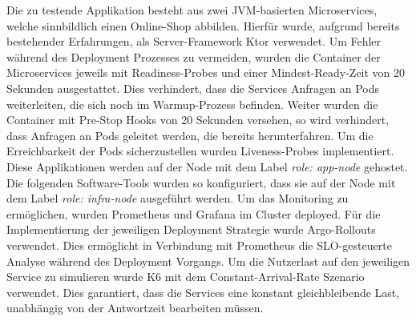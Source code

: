 \documentclass[
12pt,
a4paper,
twoside,
openright
]{report}
\begin{document}
	Die zu testende Applikation besteht aus zwei JVM-basierten Microservices, welche sinnbildlich einen Online-Shop abbilden. Hierfür wurde, aufgrund bereits bestehender Erfahrungen, als Server-Framework Ktor verwendet. Um Fehler während des Deployment Prozesses zu vermeiden, wurden die Container der Microservices jeweils mit Readiness-Probes und einer Mindest-Ready-Zeit von 20 Sekunden ausgestattet. Dies verhindert, dass die Services Anfragen an Pods weiterleiten, die sich noch im Warmup-Prozess befinden. Weiter wurden die Container mit Pre-Stop Hooks von 20 Sekunden versehen, so wird verhindert, dass Anfragen an Pods geleitet werden, die bereits herunterfahren. Um die Erreichbarkeit der Pods sicherzustellen wurden Liveness-Probes implementiert. Diese Applikationen werden auf der Node mit dem Label \textit{role: app-node} gehostet. Die folgenden Software-Tools wurden so konfiguriert, dass sie auf der Node mit dem Label \textit{role: infra-node} ausgeführt werden. Um das Monitoring zu ermöglichen, wurden Prometheus und Grafana im Cluster deployed. Für die Implementierung der jeweiligen Deployment Strategie wurde Argo-Rollouts verwendet. Dies ermöglicht in Verbindung mit Prometheus die SLO-gesteuerte Analyse während des Deployment Vorgangs. Um die Nutzerlast auf den jeweiligen Service zu simulieren wurde K6 mit dem Constant-Arrival-Rate Szenario verwendet. Dies garantiert, dass die Services eine konstant gleichbleibende Last, unabhängig von der Antwortzeit bearbeiten müssen.
	
\end{document}
